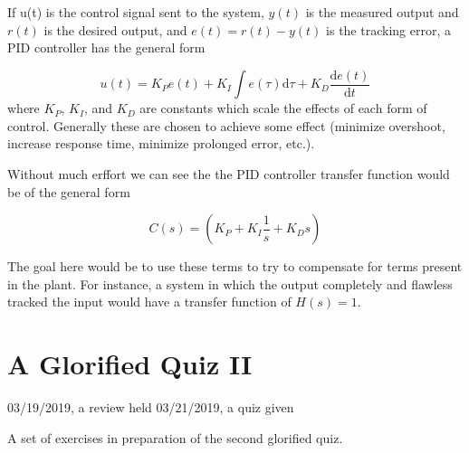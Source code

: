 \documentclass[11pt]{book}
\begin{document}
If u(t) is the control signal sent to the system, $y(t)$ is the measured output and $r(t)$ is the desired output, and $e(t)=r(t)-y(t)$ is the tracking error, a PID controller has the general form

\begin{equation}
	 u(t)=K_{P}e(t)+K_{I}\int e(\tau ){\text{d}}\tau +K_{D}{\frac {{\text{d}}e(t)}{{\text{d}}t}}
\end{equation}
where $K_P$, $K_I$, and $K_D$ are constants which scale the effects of each form of control. Generally these are chosen to achieve some effect (minimize overshoot, increase response time, minimize prolonged error, etc.).

Without much erffort we can see the the PID controller transfer function would be of the general form

\begin{equation}
	C(s)=\left(K_{P}+K_{I}{\frac {1}{s}}+K_{D}s\right)
\end{equation}

The goal here would be to use these terms to try to compensate for terms present in the plant. For instance, a system in which the output completely and flawless tracked the input would have a transfer function of $H(s) = 1$.

\chapter*{A Glorified Quiz II}
03/19/2019, a review held
03/21/2019, a quiz given

A set of exercises in preparation of the second glorified quiz.
\end{document}

